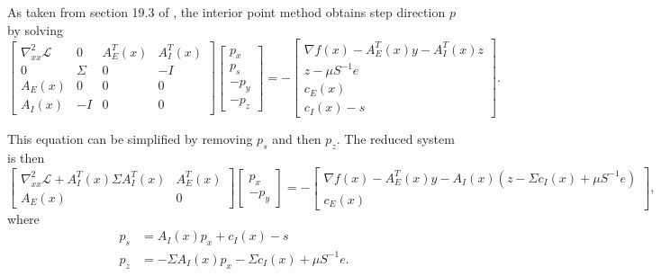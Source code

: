 \documentclass{article}
\begin{document}
As taken from section 19.3 of \cite{NW04}, 
    the interior point method obtains step direction $p$ by solving
\begin{equation}
\begin{bmatrix}
    \nabla^2_{xx}\mathcal{L} & 0 & A_E^T(x) & A_I^T(x) \\
    0 & \Sigma & 0 & -I \\
    A_E(x) & 0 & 0 & 0 \\
    A_I(x) & -I & 0 & 0
\end{bmatrix}
\begin{bmatrix} p_x \\ p_s \\ -p_y \\ -p_z \end{bmatrix}
    = -
\begin{bmatrix}
    \nabla f(x) - A_E^T(x) y - A_I^T(x) z \\
    z - \mu S^{-1} e \\
    c_E(x) \\
    c_I(x) - s
\end{bmatrix}.
\end{equation}

This equation can be simplified by removing $p_s$ and then $p_z$.
The reduced system is then
\begin{equation}
\begin{bmatrix}
    \nabla^2_{xx}\mathcal{L} + A_I^T(x) \Sigma A_I^T(x) & A_E^T(x) \\
    A_E(x) & 0 
\end{bmatrix}
\begin{bmatrix} p_x \\ -p_y \end{bmatrix}
    = -
\begin{bmatrix}
    \nabla f(x) - A_E^T(x) y - A_I(x) (z - \Sigma c_I(x) + \mu S^{-1} e) \\
    c_E(x)
\end{bmatrix},
\end{equation}
where
\begin{align}
    p_s &= A_I(x) p_x + c_I(x) - s \\
    p_z &= -\Sigma A_I(x) p_x - \Sigma c_I(x) + \mu S^{-1} e.
\end{align}
\end{document}
